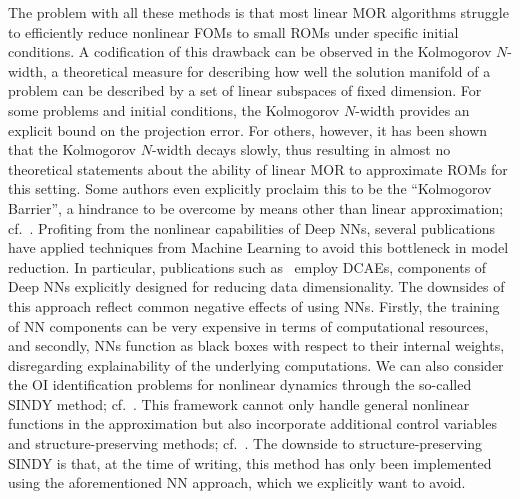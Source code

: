 The problem with all these methods is that most linear MOR algorithms struggle to efficiently reduce nonlinear \acp{FOM} to small \acp{ROM} under specific initial conditions.
A codification of this drawback can be observed in the Kolmogorov $N$-width, a theoretical measure for describing how well the solution manifold of a problem can be described by a set of linear subspaces of fixed dimension.
For some problems and initial conditions, the Kolmogorov $N$-width provides an explicit bound on the projection error.
For others, however, it has been shown that the Kolmogorov $N$-width decays slowly, thus resulting in almost no theoretical statements about the ability of linear \ac{MOR} to approximate \acp{ROM} for this setting.
Some authors even explicitly proclaim this to be the ``Kolmogorov Barrier'', a hindrance to be overcome by means other than linear approximation; cf.~\cite{Barnett2022}.
Profiting from the nonlinear capabilities of Deep \acfp{NN}, several publications have applied techniques from Machine Learning to avoid this bottleneck in model reduction.
In particular, publications such as~\cite{Lee2020, Benner2022, Romor2023, Buchfink2023} employ \acp{DCAE}, components of Deep \acp{NN} explicitly designed for reducing data dimensionality.
The downsides of this approach reflect common negative effects of using \acp{NN}.
Firstly, the training of \ac{NN} components can be very expensive in terms of computational resources, and secondly, \acp{NN} function as black boxes with respect to their internal weights, disregarding explainability of the underlying computations.
We can also consider the \ac{OI} identification problems for nonlinear dynamics through the so-called \acs{SINDY} method; cf.~\cite{Brunton2016, Kaheman2020}.
This framework cannot only handle general nonlinear functions in the approximation but also incorporate additional control variables and structure-preserving methods; cf.~\cite{Kaiser2018, Lee2022}.
The downside to structure-preserving \acs{SINDY} is that, at the time of writing, this method has only been implemented using the aforementioned \ac{NN} approach, which we explicitly want to avoid.

